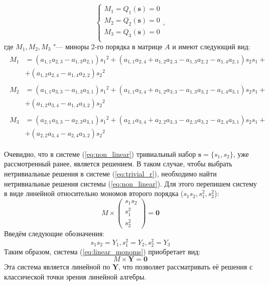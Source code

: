 \begin{equation}\label{eq:non_linear}
	\begin{cases}
		M_1 = Q_1(\mathbf{s}) = 0 \\
		M_2 = Q_2(\mathbf{s}) = 0 \\
		M_3 = Q_3(\mathbf{s}) = 0 \\
	\end{cases},
\end{equation}
где $M_1, M_2, M_3$ "--- миноры 2-го порядка в матрице $A$ и имеют следующий вид:
$$
\begin{matrix}
\begin{aligned}
M_1 &= (a_{1,1}a_{2,3} - a_{1,3}a_{2,1}) {s_{1}}^{2} + (a_{1,1}a_{2,4} + a_{1,2}a_{2,3} - 
a_{1,3}a_{2,2} - a_{1,4}a_{2,1}) s_{2}s_{1} + \\ & + (a_{1,2}a_{2,4} - a_{1,4}a_{2,2}) 
{s_{2}}^{2} 
\end{aligned}\\
\begin{aligned}
M_2 &= (a_{1,1}a_{3,3} - a_{1,3}a_{3,1}) {s_{1}}^{2} + (a_{1,1}a_{3,4} + a_{1,2}a_{3,3} - 
a_{1,3}a_{3,2} - a_{1,4}a_{3,1}) s_{2}s_{1} + \\ & + (a_{1,2}a_{3,4} - a_{1,4}a_{3,2}) 
{s_{2}}^{2} 
\end{aligned}\\
\begin{aligned}
M_3 &= (a_{2,1}a_{3,3} - a_{2,3}a_{3,1}) {s_{1}}^{2} + (a_{2,1}a_{3,4} + a_{2,2}a_{3,3} -a 
_{2,3}a_{3,2} - a_{2,4}a_{3,1}) s_{2}s_{1} + \\ & +(a_{2,2}a_{3,4} - a_{2,4}a_{3,2}) 
{s_{2}}^{2} \end{aligned}
\end{matrix}
$$

Очевидно, что в системе (\ref{eq:non_linear}) тривиальный набор $\mathbf{s} = \{s_1, s_2\}$, уже 
рассмотренный ранее, является решением. В таком случае, чтобы выбрать нетривиальные решения в системе 
(\ref{eq:trivial_r}), необходимо найти нетривиальные решения системы (\ref{eq:non_linear}). Для этого 
перепишем систему в виде линейной относительно мономов второго порядка ($s_1 s_2, s_1^2, s_2^2$):
\begin{equation}\label{eq:linear_monoms}
	M \times \begin{pmatrix} s_1 s_2 \\ s_1 ^ 2 \\ s_2 ^ 2 \end{pmatrix} = \mathbf{0}
\end{equation}
Введём следующие обозначения: 
$$
	s_1 s_2 = Y_1, s_1^2 = Y_2, s_2^2 = Y_3
$$
Таким образом, система (\ref{eq:linear_monoms}) приобретает вид:
\begin{equation}\label{eq:linear_y}
	M \times \mathbf{Y} = \mathbf{0}
\end{equation}
Эта система является линейной по $\mathbf{Y}$, что позволяет рассматривать её решения с классической 
точки зрения линейной алгебры.

